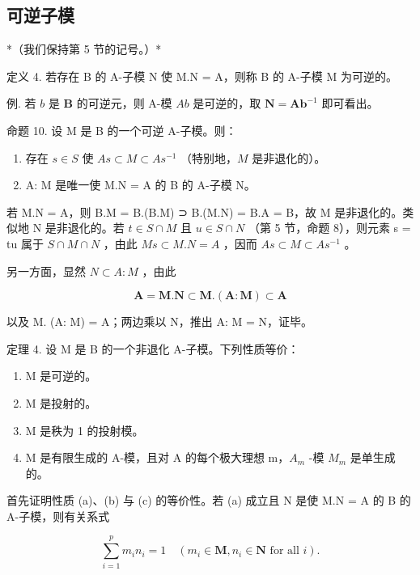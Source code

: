 \subsection{可逆子模}

*（我们保持第 5 节的记号。）*

定义 4. 若存在 B 的 A-子模 N 使 M.N = A，则称 B 的 A-子模 M 为可逆的。

例. 若 \(b\) 是 \(\mathbf{B}\) 的可逆元，则 A-模 \(Ab\) 是可逆的，取 \(\mathbf{N} = \mathbf{Ab}^{-1}\) 即可看出。

命题 10. 设 M 是 B 的一个可逆 A-子模。则：

\begin{enumerate}
\def\labelenumi{(\roman{enumi})}
\item
  存在 \(s \in S\) 使 \(As \subset M \subset As^{-1}\) （特别地，\(M\) 是非退化的）。
\item
  A: M 是唯一使 M.N = A 的 B 的 A-子模 N。
\end{enumerate}

若 M.N = A，则 B.M = B.(B.M) ⊃ B.(M.N) = B.A = B，故 M 是非退化的。类似地 N 是非退化的。若 \(t \in S \cap M\) 且 \(u \in S \cap N\) （第 5 节，命题 8），则元素 s = tu 属于 \(S \cap M \cap N\) ，由此 \(Ms \subset M.N = A\) ，因而 \(As \subset M \subset As^{-1}\) 。

另一方面，显然 \(N \subset A: M\) ，由此

\[
\mathbf {A} = \mathbf {M}. \mathbf {N} \subset \mathbf {M}. (\mathbf {A}: \mathbf {M}) \subset \mathbf {A}
\]

以及 M. (A: M) = A；两边乘以 N，推出 A: M = N，证毕。

定理 4. 设 M 是 B 的一个非退化 A-子模。下列性质等价：

\begin{enumerate}
\def\labelenumi{(\alph{enumi})}
\item
  M 是可逆的。
\item
  M 是投射的。
\item
  M 是秩为 1 的投射模。
\item
  M 是有限生成的 A-模，且对 A 的每个极大理想 m，\(A_{m}\) -模 \(M_{m}\) 是单生成的。
\end{enumerate}

首先证明性质 (a)、(b) 与 (c) 的等价性。若 (a) 成立且 N 是使 M.N = A 的 B 的 A-子模，则有关系式

\[
\sum_ {i = 1} ^ {p} m _ {i} n _ {i} = 1 \quad (m _ {i} \in \mathbf {M}, n _ {i} \in \mathbf {N} \text {   for   all   } i).\tag{9}
\]

